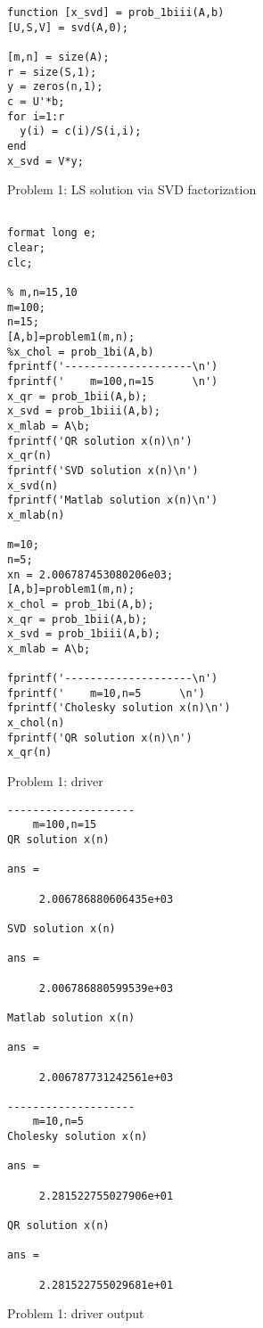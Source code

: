\documentclass[10pt]{article}
\begin{document}
\begin{program}
\begin{verbatim}
function [x_svd] = prob_1biii(A,b)
[U,S,V] = svd(A,0);

[m,n] = size(A);
r = size(S,1);
y = zeros(n,1);
c = U'*b;
for i=1:r
  y(i) = c(i)/S(i,i);
end
x_svd = V*y;
\end{verbatim}
  \caption{Problem 1: LS solution via SVD factorization}
\end{program}

\begin{program}
\begin{verbatim}

format long e;
clear;
clc; 

% m,n=15,10
m=100;
n=15;
[A,b]=problem1(m,n);
%x_chol = prob_1bi(A,b)
fprintf('--------------------\n')
fprintf('    m=100,n=15      \n')
x_qr = prob_1bii(A,b);
x_svd = prob_1biii(A,b);
x_mlab = A\b;
fprintf('QR solution x(n)\n')
x_qr(n)
fprintf('SVD solution x(n)\n')
x_svd(n)
fprintf('Matlab solution x(n)\n')
x_mlab(n)

m=10;
n=5;
xn = 2.006787453080206e03;
[A,b]=problem1(m,n);
x_chol = prob_1bi(A,b);
x_qr = prob_1bii(A,b);
x_svd = prob_1biii(A,b);
x_mlab = A\b;

fprintf('--------------------\n')
fprintf('    m=10,n=5      \n')
fprintf('Cholesky solution x(n)\n')
x_chol(n)
fprintf('QR solution x(n)\n')
x_qr(n)\end{verbatim}
  \caption{Problem 1: driver}
\end{program}

\begin{printout}
\begin{verbatim}
--------------------
    m=100,n=15      
QR solution x(n)

ans =

     2.006786880606435e+03

SVD solution x(n)

ans =

     2.006786880599539e+03

Matlab solution x(n)

ans =

     2.006787731242561e+03

--------------------
    m=10,n=5      
Cholesky solution x(n)

ans =

     2.281522755027906e+01

QR solution x(n)

ans =

     2.281522755029681e+01
\end{verbatim}
  \caption{Problem 1: driver output}
\end{printout}
\end{document}
